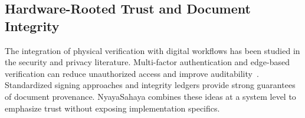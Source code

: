 \subsection{Hardware-Rooted Trust and Document Integrity}

The integration of physical verification with digital workflows has been studied in the security and privacy literature. Multi-factor authentication and edge-based verification can reduce unauthorized access and improve auditability~\cite{jain2016biometric, shi2016edge}. Standardized signing approaches and integrity ledgers provide strong guarantees of document provenance. NyayaSahaya combines these ideas at a system level to emphasize trust without exposing implementation specifics.
